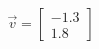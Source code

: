 \documentclass[preview]{standalone}
\begin{document}
\begin{align*}
\vec{v}=\begin{bmatrix}-1.3\\1.8\end{bmatrix}
\end{align*}
\end{document}
